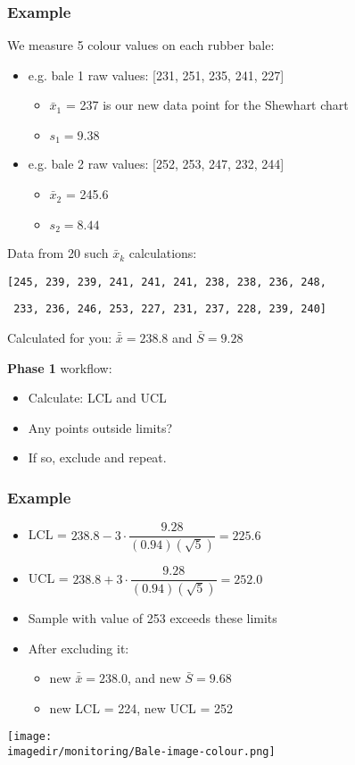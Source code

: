 \begin{frame}\frametitle{Example}

	We measure 5 colour values on each rubber bale:
	\begin{itemize}
		\item	e.g. bale 1 raw values: [231, 251, 235, 241, 227]
		\begin{itemize}
			\item	$\bar{x}_1$ = 237 is our new data point for the Shewhart chart
			\item	$s_1 = 9.38$
		\end{itemize}
		\item	e.g. bale 2 raw values: [252, 253, 247, 232, 244]
		\begin{itemize}
			\item	$\bar{x}_2$ = 245.6
			\item	$s_2 = 8.44$
		\end{itemize}
	\end{itemize}

	Data from 20 such $\bar{x}_k$ calculations:

	\texttt{[245, 239, 239, 241, 241, 241, 238, 238, 236, 248, }

	\texttt{ 233, 236, 246, 253, 227, 231, 237, 228, 239, 240]}

	Calculated for you: $\bar{\bar{x}} = 238.8$ and $\bar{S} = 9.28$

	\textbf{Phase 1} workflow:
	\begin{itemize}
		\item	Calculate: LCL and UCL
		\item	Any points outside limits?
		\item	If so, exclude and repeat.
	\end{itemize}
\end{frame}

\begin{frame}\frametitle{Example}
	\begin{itemize}
		\item	LCL = $238.8 - 3 \cdot \dfrac{9.28}{(0.94)(\sqrt{5})} = 225.6$
		\item	UCL = $238.8 + 3 \cdot \dfrac{9.28}{(0.94)(\sqrt{5})} = 252.0$
		\item	Sample with value of 253 exceeds these limits
		\item	After excluding it:
		\begin{itemize}
			\item	new $\bar{\bar{x}} = 238.0$, and new $\bar{S} = 9.68$
			\item	new LCL = 224, new UCL = 252
		\end{itemize}
	\end{itemize}
	\begin{center}
		\texttt{[image: \\imagedir/monitoring/Bale-image-colour.png]}
	\end{center}
\end{frame}


